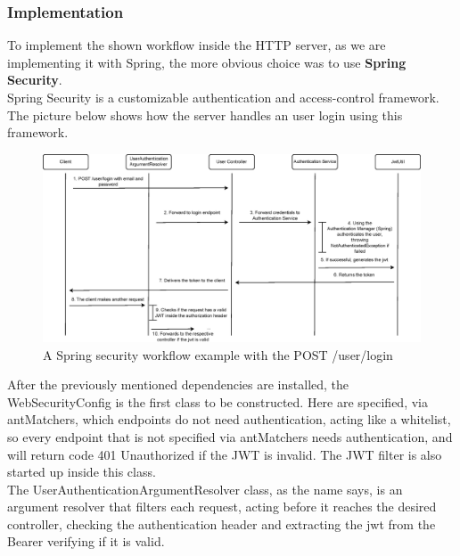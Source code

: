 \subsubsection{Implementation}

To implement the shown workflow inside the HTTP server, as we are implementing it with Spring, the more obvious choice was to use \textbf{Spring Security}\cite{springsecurity}.\\

Spring Security is a customizable authentication and access-control framework.\\

The picture below shows how the server handles an user login using this framework.\\

\begin{figure}[H]
    \begin{center}
        \includegraphics[scale=0.60]{_figures/Spring-jwt-diagram.eps}
        \caption{A Spring security workflow example with the POST /user/login}
    \end{center}
\end{figure}

After the previously mentioned dependencies are installed, the WebSecurityConfig is the first class to be constructed. Here are specified, via antMatchers, which
endpoints do not need authentication, acting like a whitelist, so every endpoint that is not specified via antMatchers needs authentication, and will return code 401
Unauthorized if the JWT is invalid. The JWT filter is also started up inside this class.\\

The UserAuthenticationArgumentResolver class, as the name says, is an argument resolver that filters each request, acting before it reaches the desired controller,
checking the authentication header and extracting the jwt from the Bearer verifying if it is valid.\\

